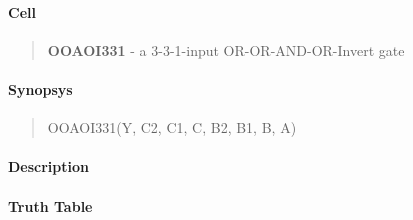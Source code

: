 \label{OOAOI331}
\paragraph{Cell}
\begin{quote}
    \textbf{OOAOI331} - a 3-3-1-input OR-OR-AND-OR-Invert gate
\end{quote}

\paragraph{Synopsys}
\begin{quote}
    OOAOI331(Y, C2, C1, C, B2, B1, B, A)
\end{quote}

\paragraph{Description}

%

\paragraph{Truth Table}
%

